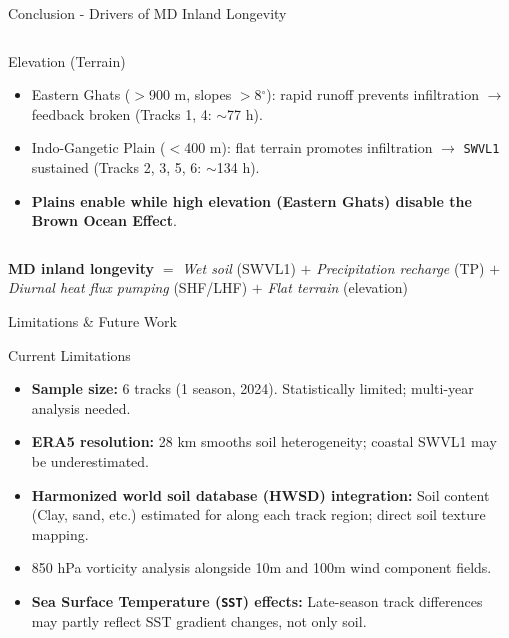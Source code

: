 \documentclass[10pt, aspectratio=169,t,xcolor=table]{beamer}
\begin{document}
\begin{frame}{Conclusion - Drivers of MD Inland Longevity}
\begin{columns}[T]
		\vspace{0.1cm}
		\begin{block}{\small {} Elevation (Terrain)}
			\footnotesize
			\begin{itemize}
				\item Eastern Ghats ($>$900 m, slopes $>$8$^\circ$): rapid runoff prevents infiltration $\to$ feedback broken (Tracks 1, 4: $\sim$77 h).
				\item Indo-Gangetic Plain ($<$400 m): flat terrain promotes infiltration $\to$ \texttt{SWVL1} sustained (Tracks 2, 3, 5, 6: $\sim$134 h).
				\item \textbf{Plains enable while high elevation (Eastern Ghats) disable the Brown Ocean Effect}.
			\end{itemize}
		\end{block}
	\end{columns}

	\vspace{0.1cm}
	\begin{alertblock}{}
		\centering \footnotesize
		\textbf{MD inland longevity} $=$ \textit{Wet soil} (SWVL1) $+$ \textit{Precipitation recharge} (TP) $+$ \textit{Diurnal heat flux pumping} (SHF/LHF) $+$ \textit{Flat terrain} (elevation)
	\end{alertblock}
\end{frame}
\begin{frame}{Limitations \& Future Work}
	\vspace{-0.5cm}
	\begin{block}{\small Current Limitations}
		\begin{itemize}\footnotesize
			\item \textbf{Sample size:} 6 tracks (1 season, 2024). Statistically limited; multi-year analysis needed.
			\item \textbf{ERA5 resolution:} 28 km smooths soil heterogeneity; coastal SWVL1 may be underestimated.
			\item \textbf{Harmonized world soil database (HWSD) integration:} Soil content (Clay, sand, etc.) estimated for along each track region; direct soil texture mapping.
			\item 850 hPa vorticity analysis alongside 10m and 100m wind component fields.
			\item \textbf{Sea Surface Temperature (\texttt{SST}) effects:} Late-season track differences may partly reflect SST gradient changes, not only soil.
		\end{itemize}
	\end{block}
	\vfill
\end{frame}
\end{document}

